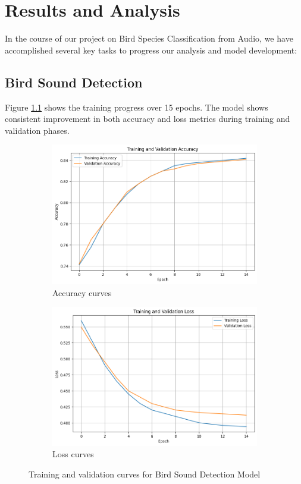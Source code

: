 \chapter{Results and Analysis}
In the course of our project on Bird Species Classification from Audio, we have
accomplished several key tasks to progress our analysis and model development:

\section{Bird Sound Detection}

Figure \ref{fig:training_curves} shows the training progress over 15 epochs. The model shows consistent improvement in both accuracy and loss metrics during training and validation phases.

\begin{figure}[h!]
      \centering
      \begin{subfigure}{\textwidth}
            \includegraphics[width=\textwidth]{images/det_acc.png}
            \caption{Accuracy curves}
      \end{subfigure}
      \begin{subfigure}{\textwidth}
            \includegraphics[width=\textwidth]{images/det_loss.png}
            \caption{Loss curves}
      \end{subfigure}
      \caption{Training and validation curves for Bird Sound Detection Model}
      \label{fig:training_curves}
\end{figure}

